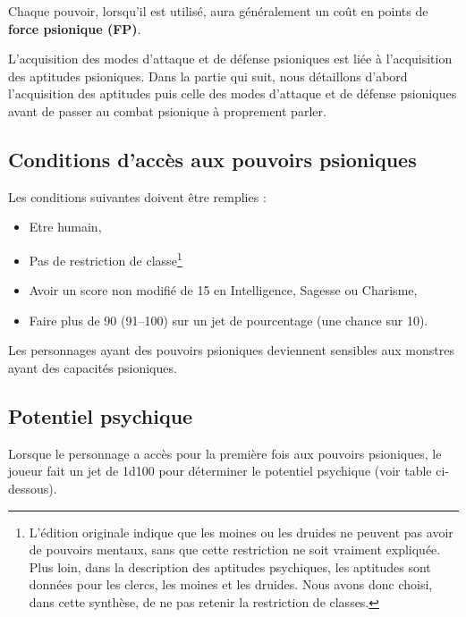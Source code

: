 \documentclass[11pt]{article}
\begin{document}
{\bigskip

Chaque pouvoir, lorsqu'il est utilisé, aura généralement un coût en points de \textbf{force psionique (FP)}.

L'acquisition des modes d'attaque et de défense psioniques est liée à l'acquisition des aptitudes psioniques. Dans la partie qui suit, nous détaillons d'abord l'acquisition des aptitudes puis celle des modes d'attaque et de défense psioniques avant de passer au combat psionique à proprement parler.

\subsection*{Conditions d'accès aux pouvoirs psioniques}

Les conditions suivantes doivent être remplies :

\bigskip

\begin{itemize}
\item Etre humain,
\item Pas de restriction de classe\footnote{L'édition originale indique que les moines ou les druides ne peuvent pas avoir de pouvoirs mentaux, sans que cette restriction ne soit vraiment expliquée. Plus loin, dans la description des aptitudes psychiques, les aptitudes sont données pour les clercs, les moines et les druides. Nous avons donc choisi, dans cette synthèse, de ne pas retenir la restriction de classes.}
\item Avoir un score non modifié de 15 en Intelligence, Sagesse ou Charisme,
\item Faire plus de 90 (91--100) sur un jet de pourcentage (une chance sur 10).
\end{itemize}

\bigskip

Les personnages ayant des pouvoirs psioniques deviennent sensibles aux monstres ayant des capacités psioniques.

\subsection*{Potentiel psychique}

Lorsque le personnage a accès pour la première fois aux pouvoirs psioniques, le joueur fait un jet de 1d100 pour déterminer le potentiel psychique (voir table ci-dessous).
\bigskip

}
\end{document}
